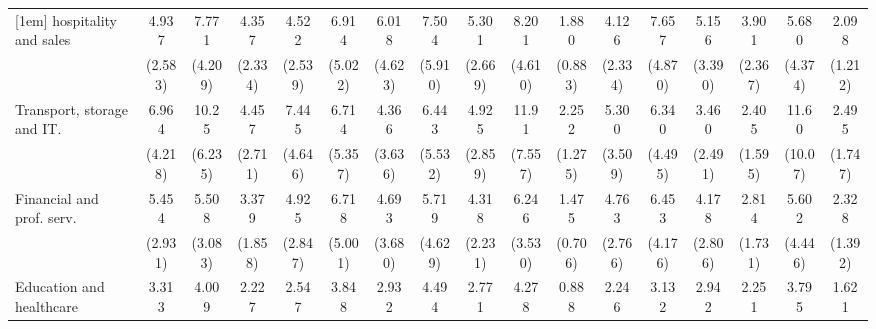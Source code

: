 {\begin{tabular}{l*{16}{c}}
[1em]
hospitality and sales&       4.937\sym{**} &       7.771\sym{***}&       4.357\sym{**} &       4.522\sym{**} &       6.914\sym{**} &       6.018\sym{*}  &       7.504\sym{*}  &       5.301\sym{***}&       8.201\sym{***}&       1.880         &       4.126\sym{*}  &       7.657\sym{**} &       5.156\sym{*}  &       3.901\sym{*}  &       5.680\sym{*}  &       2.098         \\
                    &     (2.583)         &     (4.209)         &     (2.334)         &     (2.539)         &     (5.022)         &     (4.623)         &     (5.910)         &     (2.669)         &     (4.610)         &     (0.883)         &     (2.334)         &     (4.870)         &     (3.390)         &     (2.367)         &     (4.374)         &     (1.212)         \\
[1em]
Transport, storage and IT.&       6.964\sym{**} &       10.25\sym{***}&       4.457\sym{*}  &       7.445\sym{**} &       6.714\sym{*}  &       4.366         &       6.443\sym{*}  &       4.925\sym{**} &       11.91\sym{***}&       2.252         &       5.300\sym{*}  &       6.340\sym{**} &       3.460         &       2.405         &       11.60\sym{**} &       2.495         \\
                    &     (4.218)         &     (6.235)         &     (2.711)         &     (4.646)         &     (5.357)         &     (3.636)         &     (5.532)         &     (2.859)         &     (7.557)         &     (1.275)         &     (3.509)         &     (4.495)         &     (2.491)         &     (1.595)         &     (10.07)         &     (1.747)         \\
[1em]
Financial and prof. serv.&       5.454\sym{**} &       5.508\sym{**} &       3.379\sym{*}  &       4.925\sym{**} &       6.718\sym{*}  &       4.693\sym{*}  &       5.719\sym{*}  &       4.318\sym{**} &       6.246\sym{**} &       1.475         &       4.763\sym{**} &       6.453\sym{**} &       4.178\sym{*}  &       2.814         &       5.602\sym{*}  &       2.328         \\
                    &     (2.931)         &     (3.083)         &     (1.858)         &     (2.847)         &     (5.001)         &     (3.680)         &     (4.629)         &     (2.231)         &     (3.530)         &     (0.706)         &     (2.766)         &     (4.176)         &     (2.806)         &     (1.731)         &     (4.446)         &     (1.392)         \\
[1em]
Education and healthcare&       3.313\sym{*}  &       4.009\sym{*}  &       2.227         &       2.547         &       3.848         &       2.932         &       4.494         &       2.771         &       4.278\sym{*}  &       0.888         &       2.246         &       3.132         &       2.942         &       2.251         &       3.795         &       1.621         \\

\end{tabular}}
